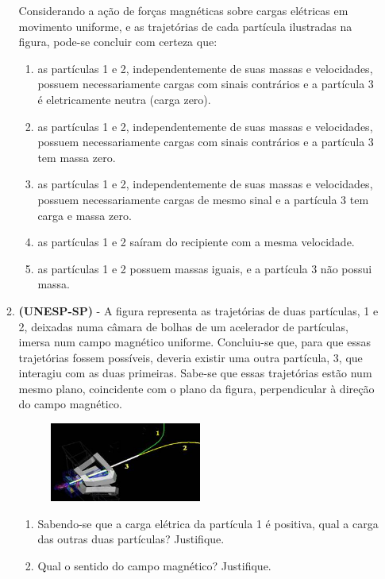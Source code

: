 \documentclass[12pt,letterpaper,fleqn]{article}
\begin{document}
\begin{itemize}
\begin{enumerate}
            Considerando a ação de forças magnéticas sobre cargas elétricas em movimento uniforme, e as trajetórias de cada partícula ilustradas na figura, pode-se concluir com certeza que:
            
            \begin{enumerate}
                \item as partículas 1 e 2, independentemente de suas massas e velocidades, possuem necessariamente cargas com sinais contrários e a partícula 3 é eletricamente neutra (carga zero).
                \item as partículas 1 e 2, independentemente de suas massas e velocidades, possuem necessariamente cargas com sinais contrários e a partícula 3 tem massa zero.
                \item as partículas 1 e 2, independentemente de suas massas e velocidades, possuem necessariamente cargas de mesmo sinal e a partícula 3 tem carga e massa zero. 
                \item as partículas 1 e 2 saíram do recipiente com a mesma velocidade.
                \item as partículas 1 e 2 possuem massas iguais, e a partícula 3 não possui massa.
            \end{enumerate}
            
            \item \textbf{(UNESP-SP)} - A figura representa as trajetórias de duas partículas, 1 e 2, deixadas numa câmara de bolhas de um acelerador de partículas, imersa num campo magnético uniforme. Concluiu-se que, para que essas trajetórias fossem possíveis, deveria existir uma outra partícula, 3, que interagiu com as duas primeiras. Sabe-se que essas trajetórias estão num mesmo plano, coincidente com o plano da figura, perpendicular à direção do campo magnético.
            
            \begin{figure}[h]
                \centering
                \includegraphics[width=0.5\textwidth]{ex_5_forca.jpg}
            \end{figure}
            \begin{enumerate}
                \item Sabendo-se que a carga elétrica da partícula 1 é positiva, qual a carga das outras duas partículas? Justifique.
                \item Qual o sentido do campo magnético? Justifique.
            \end{enumerate}
            

\end{enumerate}
\end{itemize}
\end{document}

